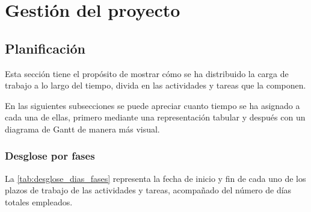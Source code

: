 \chapter{Gestión del proyecto}
\label{ch:gestion}
\section{Planificación}\label{sec:planificacion}
Esta sección tiene el propósito de mostrar cómo se ha distribuido la carga de trabajo a lo largo del tiempo, divida en las actividades y tareas que la componen.

En las siguientes subsecciones se puede apreciar cuanto tiempo se ha asignado a cada una de ellas, primero mediante una representación tabular y después con un diagrama de Gantt de manera más visual.

\subsection{Desglose por fases}\label{subsec:desglose_fases}
La \autoref{tab:desglose_dias_fases} representa la fecha de inicio y fin de cada uno de los plazos de trabajo de las actividades y tareas, acompañado del número de días totales empleados.

